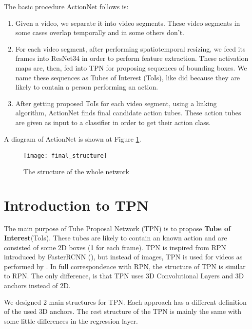 The basic procedure ActionNet follows is:
\begin{enumerate}
\item Given a video, we separate it into video segments. These video segments in some cases overlap temporally and in some others don't.
\item For each video segment, after performing spatiotemporal resizing, we feed its frames into ResNet34 in order to perform feature
  extraction. These activation maps are, then, fed into TPN for proposing sequences of bounding boxes. We name these sequences as Tubes of Interest (ToIs), 
  like \cite{DBLP:journals/corr/HouCS17} did because they are likely to contain a person performing an action.
\item After getting proposed ToIs for each video segment, using a linking algorithm, ActionNet finds final candidate action tubes. These
  action tubes are given as input to a classifier in order to get their action class.
\end{enumerate}

A diagram of ActionNet is shown at Figure \ref{fig:whole_network_}.

\begin{figure}[h]
  \centering
  \texttt{[image: final\_structure]}
  \caption{The structure of the whole network}
  \label{fig:whole_network_}
\end{figure}

\section{Introduction to TPN}
 The main purpose of Tube Proposal Network (TPN)  is to propose
\textbf{Tube of Interest}(ToIs). These tubes are likely to contain an known action and are consisted of some 2D boxes
(1 for each frame). TPN is inspired from RPN introduced by FasterRCNN (\cite{Ren:2015:FRT:2969239.2969250}), but instead of images, TPN
is used for videos as performed by \cite{DBLP:journals/corr/HouCS17}. In full correspondence with RPN, the structure
of TPN is similar to RPN. The only difference, is that TPN uses 3D Convolutional Layers and 3D anchors instead of 2D. \par
We designed 2 main structures for TPN. Each approach has a different definition of the used 3D anchors.
The rest structure of the TPN is mainly the same with some little differences in the regression layer. \par

